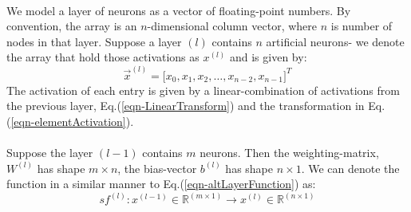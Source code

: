 \documentclass[12pt,letterpaper]{article}
\begin{document}
\paragraph*{}We model a layer of neurons as a vector of floating-point numbers. By convention, the array is an $n$-dimensional column vector, where $n$ is number of nodes in that layer. Suppose a layer $(l)$ contains $n$ artificial neurons- we denote the array that hold those activations as $x^{(l)}$ and is given by:
\begin{equation}
\label{layer-DenseNeurons}
\vec{x}^{(l)} = \Big[ x_0, x_1, x_2, \hdots , x_{n-2}, x_{n-1} \Big]^T
\end{equation}
The activation of each entry is given by a linear-combination of activations from the previous layer, Eq.(\ref{eqn-LinearTransform}) and the transformation in Eq.(\ref{eqn-elementActivation}).

\paragraph*{}Suppose the layer $(l-1)$ contains $m$ neurons. Then the weighting-matrix, $W^{(l)}$ has shape $m \times n$, the bias-vector $b^{(l)}$ has shape $n \times 1$. We can denote the function in a similar manner to Eq.(\ref{eqn-altLayerFunction}) as:
\begin{equation}
\label{eqn-FunctionDense}s
f^{(l)} : x^{(l-1)} \in \mathbb{R}^{(m \times 1)} \rightarrow x^{(l)} \in \mathbb{R}^{(n \times 1)}
\end{equation}
\end{document}
